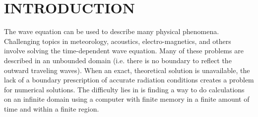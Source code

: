 \chapter{INTRODUCTION} \label{ch:intro}

The wave equation can be used to describe many physical phenomena.
Challenging topics in meteorology, acoustics, electro-magnetics, and
others involve solving the time-dependent wave equation.  Many of
these problems are described in an unbounded domain (i.e. there is no
boundary to reflect the outward traveling waves).  When an exact,
theoretical solution is unavailable, the lack of a boundary
prescription of accurate radiation conditions creates a problem for
numerical solutions.  The difficulty lies in is finding a way to do
calculations on an infinite domain using a computer with finite memory
in a finite amount of time and within a finite region.
